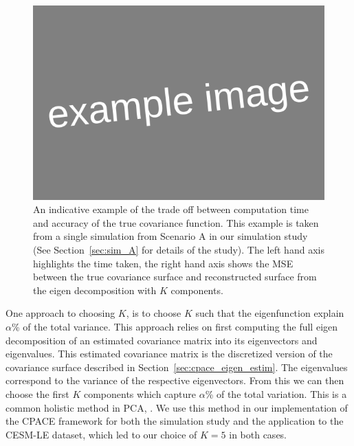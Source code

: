 \begin{figure}
	\centering
	\includegraphics[width=\textwidth]{example_image}
	\caption{An indicative example of the trade off between computation time and accuracy of the true covariance function. This example is taken from a single simulation from Scenario A in our simulation study (See Section~\ref{sec:sim_A} for details of the study). The left hand axis highlights the time taken, the right hand axis shows the MSE between the true covariance surface and reconstructed surface from the eigen decomposition with $K$ components.}
	\label{fig:sim_K}
\end{figure}

One approach to choosing $K$, is to choose $K$ such that the eigenfunction explain $\alpha$\% of the total variance.
This approach relies on first computing the full eigen decomposition of an estimated covariance matrix into its eigenvectors and eigenvalues.
This estimated covariance matrix is the discretized version of the covariance surface described in Section~\ref{sec:cpace_eigen_estim}.
The eigenvalues correspond to the variance of the respective eigenvectors.
From this we can then choose the first $K$ components which capture $\alpha$\% of the total variation. 
This is a common holistic method in PCA, \citep{jolliffe_choosing_2002}.
We use this method in our implementation of the CPACE framework for both the simulation study and the application to the CESM-LE dataset, which led to our choice of $K=5$ in both cases.

